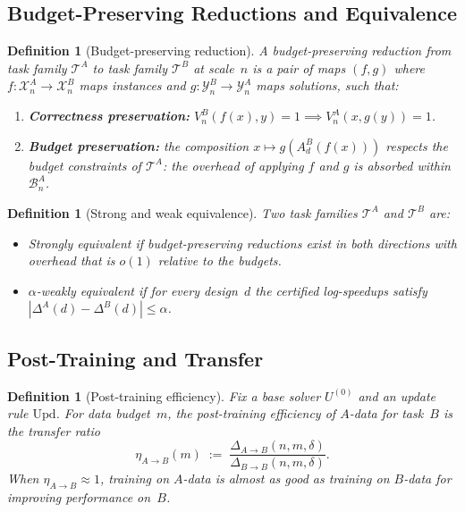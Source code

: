 \documentclass[10pt]{article}
\theoremstyle{paperplain}
\theoremstyle{paperdefinition}
\newtheorem{definition}[theorem]{Definition}
\theoremstyle{paperremark}
\newcommand{\cX}{\mathcal{X}}
\newcommand{\cY}{\mathcal{Y}}
\newcommand{\cT}{\mathcal{T}}
\newcommand{\cB}{\mathcal{B}}
\begin{document}
\subsection{Budget-Preserving Reductions and Equivalence}
\label{subsec:task-equiv-def}

\begin{definition}[Budget-preserving reduction]
\label{def:budget-preserving-reduction}
A \emph{budget-preserving reduction} from task family $\cT^A$ to task family $\cT^B$ at scale~$n$ is a pair of maps $(f,g)$ where $f: \cX^A_n \to \cX^B_n$ maps instances and $g: \cY^B_n \to \cY^A_n$ maps solutions, such that:
\begin{enumerate}
\item \textbf{Correctness preservation:} $V^B_n(f(x), y) = 1 \implies V^A_n(x, g(y)) = 1$.
\item \textbf{Budget preservation:} the composition $x \mapsto g(A_d^B(f(x)))$ respects the budget constraints of $\cT^A$: the overhead of applying $f$ and $g$ is absorbed within $\cB^A_n$.
\end{enumerate}
\end{definition}

\begin{definition}[Strong and weak equivalence]
\label{def:equivalence}
Two task families $\cT^A$ and $\cT^B$ are:
\begin{itemize}
\item \emph{Strongly equivalent} if budget-preserving reductions exist in both directions with overhead that is $o(1)$ relative to the budgets.
\item \emph{$\alpha$-weakly equivalent} if for every design~$d$ the certified log-speedups satisfy $|\Delta^A(d) - \Delta^B(d)| \le \alpha$.
\end{itemize}
\end{definition}

\subsection{Post-Training and Transfer}
\label{subsec:post-training}

\begin{definition}[Post-training efficiency]
\label{def:post-training-eff}
Fix a base solver $U^{(0)}$ and an update rule $\mathrm{Upd}$.
For data budget~$m$, the \emph{post-training efficiency of $A$-data for task~$B$} is the transfer ratio
\[
\eta_{A \to B}(m) \;:=\; \frac{\Delta_{A \to B}(n,m,\delta)}{\Delta_{B \to B}(n,m,\delta)}.
\]
When $\eta_{A \to B} \approx 1$, training on $A$-data is almost as good as training on $B$-data for improving performance on~$B$.
\end{definition}
\end{document}
